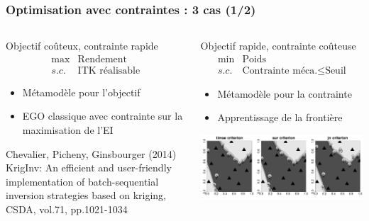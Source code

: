 \begin{frame}
\frametitle{Optimisation avec contraintes : 3 cas (1/2)}
\begin{columns}[t]
 \begin{column}{.49\textwidth}
  \begin{block}{Objectif coûteux, contrainte rapide}
$$\begin{array}{ll}
 \max & \text{Rendement}\\
 s.c. & \text{ITK réalisable}
\end{array}$$
\vspace{-3mm}
\begin{itemize}
 \item Métamodèle pour l'objectif
 \item EGO classique avec contrainte sur la maximisation de l'EI
\end{itemize}
\end{block}
\vspace{1cm}
\scriptsize{
 \begin{thebibliography}{7}
\beamertemplatearticlebibitems
{}
     Chevalier, Picheny, Ginsbourger (2014)
         \newblock KrigInv: An efficient and user-friendly implementation of batch-sequential inversion strategies based on kriging,
         \newblock  CSDA, vol.71, pp.1021-1034
\end{thebibliography}}
 \end{column}
 
\begin{column}{.49\textwidth}
 \begin{block}{Objectif rapide, contrainte coûteuse}
 \vspace{-4mm}
$$\begin{array}{ll}
 \min & \text{Poids}\\
 s.c. & \text{Contrainte méca.} \leq \text{Seuil}
\end{array}$$
\vspace{-4mm}
\begin{itemize}
 \item Métamodèle pour la contrainte
 \item Apprentissage de la frontière
\end{itemize}
\end{block}
\centering
\includegraphics[trim= 235mm 0mm 0mm 0mm, clip, width=.53\textwidth]{fig/integralcriteria.png}
\end{column}
\end{columns}
\end{frame}
